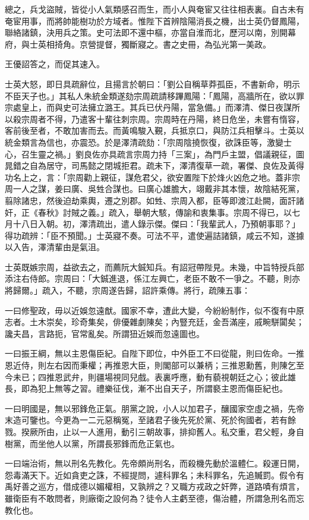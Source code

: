\begin{pinyinscope}
總之，兵戈盜賊，皆從小人氣類感召而生，而小人與奄宦又往往相表裏。自古未有奄宦用事，而將帥能樹功於方域者。惟陛下首辨陰陽消長之機，出士英仍督鳳陽，聯絡諸鎮，決用兵之策。史可法即不還中樞，亦當自淮而北，歷河以南，別開幕府，與士英相掎角。京營提督，獨斷寢之。書之史冊，為弘光第一美政。

王優詔答之，而促其速入。

士英大怒，即日具疏辭位，且揚言於朝曰：「劉公自稱草莽孤臣，不書新命，明示不臣天子也。」其私人朱統金類遂劾宗周疏請移蹕鳳陽：「鳳陽，高牆所在，欲以罪宗處皇上，而與史可法擁立潞王。其兵已伏丹陽，當急備。」而澤清、傑日夜謀所以殺宗周者不得，乃遣客十輩往刺宗周。宗周時在丹陽，終日危坐，未嘗有惰容，客前後至者，不敢加害而去。而黃鳴駿入覲，兵抵京口，與防江兵相擊斗。士英以統金類言為信也，亦震恐。於是澤清疏劾：「宗周陰撓恢復，欲誅臣等，激變士心，召生靈之禍。」劉良佐亦具疏言宗周力持「三案」，為門戶主盟，倡議親征，圖晁錯之自為居守，司馬懿之閉城拒君。疏未下，澤清復草一疏，署傑、良佐及黃得功名上之，言：「宗周勸上親征，謀危君父，欲安置陛下於烽火凶危之地。蓋非宗周一人之謀，姜曰廣、吳甡合謀也。曰廣心雄膽大，翊戴非其本懷，故陰結死黨，翦除諸忠，然後迫劫乘輿，遷之別郡。如甡、宗周入都，臣等即渡江赴闕，面訐諸奸，正《春秋》討賊之義。」疏入，舉朝大駭，傳諭和衷集事。宗周不得已，以七月十八日入朝。初，澤清疏出，遣人錄示傑。傑曰：「我輩武人，乃預朝事耶？」得功疏辨：「臣不預聞。」士英寢不奏。可法不平，遣使遍詰諸鎮，咸云不知，遂據以入告，澤清輩由是氣沮。

士英既嫉宗周，益欲去之，而薦阮大鋮知兵。有詔冠帶陛見。未幾，中旨特授兵部添注右侍郎。宗周曰：「大鋮進退，係江左興亡，老臣不敢不一爭之。不聽，則亦將歸爾。」疏入，不聽，宗周遂告歸，詔許乘傳。將行，疏陳五事：

一曰修聖政，毋以近娛忽遠猷。國家不幸，遭此大變，今紛紛制作，似不復有中原志者。土木崇矣，珍奇集矣，俳優雜劇陳矣；內豎充廷，金吾滿座，戚畹駢闐矣；讒夫昌，言路扼，官常亂矣。所謂狃近娛而忽遠圖也。

一曰振王綱，無以主恩傷臣紀。自陛下即位，中外臣工不曰從龍，則曰佐命。一推恩近侍，則左右因而秉權；再推恩大臣，則閣部可以兼柄；三推恩勳舊，則陳乞至今未已；四推恩武弁，則疆場視同兒戲。表裏呼應，動有藐視朝廷之心；彼此雄長，即為犯上無等之習。禮樂征伐，漸不出自天子，所謂褻主恩而傷臣紀也。

一曰明國是，無以邪鋒危正氣。朋黨之說，小人以加君子，釀國家空虛之禍，先帝末造可鑒也。今更為一二元惡稱冤，至諸君子後先死於黨、死於徇國者，若有餘戮。揆厥所由，止以一人進用，動引三朝故事，排抑舊人。私交重，君父輕，身自樹黨，而坐他人以黨，所謂長邪鋒而危正氣也。

一曰端治術，無以刑名先教化。先帝頗尚刑名，而殺機先動於溫體仁。殺運日開，怨毒滿天下。近如貪吏之誅，不經提問，遽科罪名；未科罪名，先追贓罰。假令有禹好善之巡方，借成德以媚權相，又孰辨之？又職方戎政之奸弊，道路嘖有煩言，雖衛臣有不敢問者，則廠衛之設何為？徒令人主虧至德，傷治體，所謂急刑名而忘教化也。


\end{pinyinscope}
